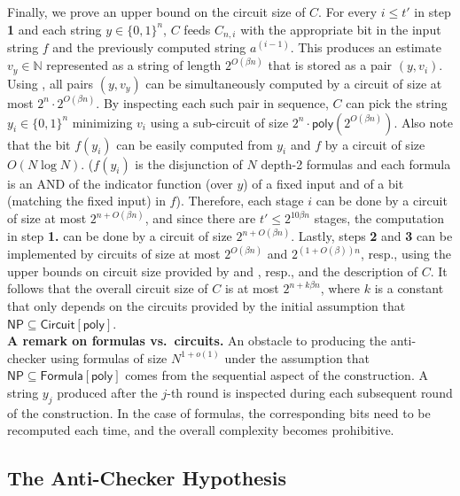 \documentclass{toc}
\begin{document}
Finally, we %
prove an upper bound on %
the circuit size of $C$. For every $i \leq t'$ in step \textbf{1} and each string $y \in \{0,1\}^n$, $C$ feeds $C_{n,i}$ with the appropriate bit in the input string $f$ and the previously computed string $a^{(i-1)}$. This produces an estimate $v_y \in \mathbb{N}$ represented as a string of length $2^{O(\beta n)}$ that is stored as a pair $(y,v_i)$. Using , all pairs $(y,v_y)$ can be simultaneously computed by a circuit of size at most $2^n \cdot 2^{O(\beta n)}$. By inspecting each such pair in sequence, $C$ can pick the string $y_i \in \{0,1\}^n$ minimizing $v_i$ using a sub-circuit of size $2^{n} \cdot \mathsf{poly}(2^{O(\beta n)})$. Also note that the bit $f(y_i)$ can be easily computed from $y_i$ and $f$ by a circuit of size $O(N \log N)$. ($f(y_i)$ is the disjunction of $N$ depth-2 formulas and each formula is an AND of the indicator function (over $y$) of a fixed input and of a bit (matching the fixed input) in $f$). Therefore, each stage $i$ can be done by a circuit of size at most $2^{n + O(\beta n)}$, and since there are $t' \leq 2^{10\beta n}$ stages, the computation in step \textbf{1.}  can be done by a circuit of size $2^{n + O(\beta n)}$. Lastly, steps \textbf{2} and \textbf{3} can be implemented by
%
circuits  %
of size at most $2^{O(\beta n)}$ %
and %
$2^{(1+O(\beta))n}$,
resp.,   %
using the upper bounds on circuit size provided by 
and %
,
resp.,   %
and the description of $C$. It follows that the overall circuit size of $C$ is at most $2^{n + k \beta n}$, where $k$ is a constant that only depends on the circuits provided by the initial assumption that $\mathsf{NP} \subseteq \mathsf{Circuit}[\mathsf{poly}]$.\\

\noindent \textbf{A remark on formulas vs.~circuits.} An obstacle to producing the anti-checker using formulas of size $N^{1 + o(1)}$ under the assumption that $\mathsf{NP} \subseteq \mathsf{Formula}[\mathsf{poly}]$ comes from the sequential aspect of the construction. A string $y_j$ produced after the $j$-th round is inspected during each subsequent round of the construction. In the case of formulas, the corresponding bits need to be recomputed each time, and the overall complexity becomes prohibitive. 


\subsection{The Anti-Checker Hypothesis}\label{ss:antichecker_hyp}
\end{document}
